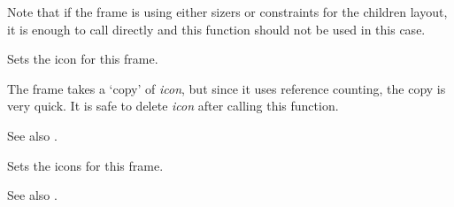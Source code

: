 Note that if the frame is using either sizers or constraints for the children
layout, it is enough to call  directly and
this function should not be used in this case.

\label{wxframeseticon}


Sets the icon for this frame.




The frame takes a `copy' of {\it icon}, but since it uses reference
counting, the copy is very quick. It is safe to delete {\it icon} after
calling this function.

See also .

\label{wxframeseticons}


Sets the icons for this frame.



See also .

%
%
%
%
%
%

